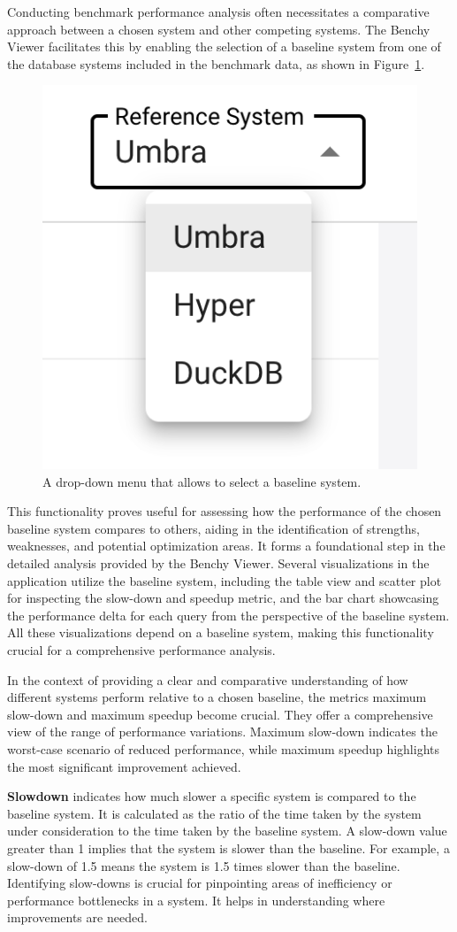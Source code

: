 Conducting benchmark performance analysis often necessitates a comparative approach between a chosen system and other competing systems. The Benchy Viewer facilitates this by enabling the selection of a baseline system from one of the database systems included in the benchmark data, as shown in Figure~\ref{fig:select-baseline-system}.

\begin{figure}[h]
  \centering
  \includegraphics[width=0.3\linewidth]{figures/select-baseline-system.png}
  \caption{A drop-down menu that allows to select a baseline system.}
  \label{fig:select-baseline-system}
\end{figure}


This functionality proves useful for assessing how the performance of the chosen baseline system compares to others, aiding in the identification of strengths, weaknesses, and potential optimization areas. It forms a foundational step in the detailed analysis provided by the Benchy Viewer. Several visualizations in the application utilize the baseline system, including the table view and scatter plot for inspecting the slow-down and speedup metric, and the bar chart showcasing the performance delta for each query from the perspective of the baseline system. All these visualizations depend on a baseline system, making this functionality crucial for a comprehensive performance analysis.

In the context of providing a clear and comparative understanding of how different systems perform relative to a chosen baseline, the metrics maximum slow-down and maximum speedup become crucial. They offer a comprehensive view of the range of performance variations. Maximum slow-down indicates the worst-case scenario of reduced performance, while maximum speedup highlights the most significant improvement achieved.

\textbf{Slowdown} indicates how much slower a specific system is compared to the baseline system. It is calculated as the ratio of the time taken by the system under consideration to the time taken by the baseline system. A slow-down value greater than 1 implies that the system is slower than the baseline. For example, a slow-down of 1.5 means the system is 1.5 times slower than the baseline.\\
Identifying slow-downs is crucial for pinpointing areas of inefficiency or performance bottlenecks in a system. It helps in understanding where improvements are needed.

